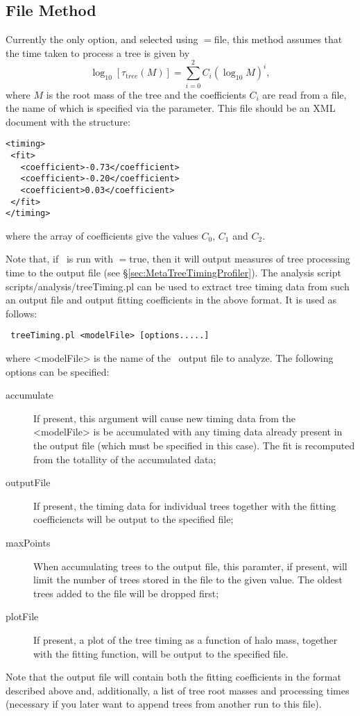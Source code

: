 \subsection{File Method}

Currently the only option, and selected using {\normalfont \ttfamily [timePerTreeMethod]}$=${\normalfont \ttfamily file}, this method assumes that the time taken to process a tree is given by
\begin{equation}
 \log_{10} [ \tau_{\mathrm tree}(M)] = \sum_{i=0}^2 C_i (\log_{10} M)^i,
\end{equation}
where $M$ is the root mass of the tree and the coefficients $C_i$ are read from a file, the name of which is specified via the {\normalfont \ttfamily [timePerTreeFitFileName]} parameter. This file should be an XML document with the structure:
\begin{verbatim}
<timing>
 <fit>
   <coefficient>-0.73</coefficient>
   <coefficient>-0.20</coefficient>
   <coefficient>0.03</coefficient>
 </fit>
</timing>
\end{verbatim}
where the array of coefficients give the values $C_0$, $C_1$ and $C_2$.

Note that, if \glc\ is run with {\normalfont \ttfamily [metaCollectTimingData]}$=${\normalfont \ttfamily true}, then it will output measures of tree processing time to the output file (see \S\ref{sec:MetaTreeTimingProfiler}). The analysis script {\normalfont \ttfamily scripts/analysis/treeTiming.pl} can be used to extract tree timing data from such an output file and output fitting coefficients in the above format. It is used as follows:
\begin{verbatim}
 treeTiming.pl <modelFile> [options.....]
\end{verbatim}
where {\normalfont \ttfamily <modelFile>} is the name of the \glc\ output file to analyze. The following options can be specified:
\begin{description}
 \item [{\normalfont \ttfamily accumulate}] If present, this argument will cause new timing data from the {\normalfont \ttfamily <modelFile>} is be accumulated with any timing data already present in the output file (which must be specified in this case). The fit is recomputed from the totallity of the accumulated data;
 \item [{\normalfont \ttfamily outputFile}] If present, the timing data for individual trees together with the fitting coefficiencts will be output to the specified file;
 \item [{\normalfont \ttfamily maxPoints}] When accumulating trees to the output file, this paramter, if present, will limit the number of trees stored in the file to the given value. The oldest trees added to the file will be dropped first;
 \item [{\normalfont \ttfamily plotFile}] If present, a plot of the tree timing as a function of halo mass, together with the fitting function, will be output to the specified file.
\end{description}
Note that the output file will contain both the fitting coefficients in the format described above and, additionally, a list of tree root masses and processing times (necessary if you later want to append trees from another run to this file).
